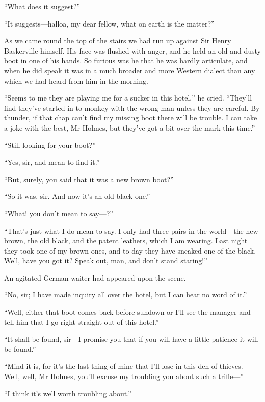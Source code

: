\documentclass[paper=5.5in:8.5in,BCOR=7mm,twoside,DIV=calc,12pt,usegeometry,openany,chapterprefix,endperiod,headings=big]{scrbook} %
\begin{document}
\enquote{What does it suggest?}

\enquote{It suggests---halloa, my dear fellow, what on earth is the matter?}

As we came round the top of the stairs we had run up against Sir Henry Baskerville himself. His face was flushed with anger, and he held an old and dusty boot in one of his hands. So furious was he that he was hardly articulate, and when he did speak it was in a much broader and more Western dialect than any which we had heard from him in the morning.

\enquote{Seems to me they are playing me for a sucker in this hotel,} he cried. \enquote{They'll find they've started in to monkey with the wrong man unless they are careful. By thunder, if that chap can't find my missing boot there will be trouble. I can take a joke with the best, Mr Holmes, but they've got a bit over the mark this time.}

\enquote{Still looking for your boot?}

\enquote{Yes, sir, and mean to find it.}

\enquote{But, surely, you said that it was a new brown boot?}

\enquote{So it was, sir. And now it's an old black one.}

\enquote{What! you don't mean to say---?}

\enquote{That's just what I do mean to say. I only had three pairs in the world---the new brown, the old black, and the patent leathers, which I am wearing. Last night they took one of my brown ones, and to-day they have sneaked one of the black. Well, have you got it? Speak out, man, and don't stand staring!}

An agitated German waiter had appeared upon the scene.

\enquote{No, sir; I have made inquiry all over the hotel, but I can hear no word of it.}

\enquote{Well, either that boot comes back before sundown or I'll see the manager and tell him that I go right straight out of this hotel.}

\enquote{It shall be found, sir---I promise you that if you will have a little patience it will be found.}

\enquote{Mind it is, for it's the last thing of mine that I'll lose in this den of thieves. Well, well, Mr Holmes, you'll excuse my troubling you about such a trifle---}

\enquote{I think it's well worth troubling about.}
\end{document}
